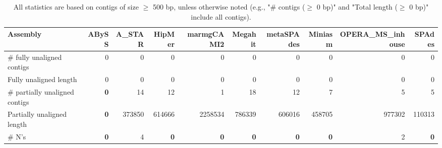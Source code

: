 \documentclass[12pt,a4paper]{article}
\begin{document}
\begin{table}[ht]
\begin{center}
\caption{All statistics are based on contigs of size $\geq$ 500 bp, unless otherwise noted (e.g., "\# contigs ($\geq$ 0 bp)" and "Total length ($\geq$ 0 bp)" include all contigs).}
\begin{tabular}{|l*{9}{|r}|}
\hline
Assembly & ABySS & A\_STAR & HipMer & marmgCAMI2 & Megahit & metaSPAdes & Miniasm & OPERA\_MS\_inhouse & SPAdes \\ \hline
\# fully unaligned contigs & 0 & 0 & 0 & 0 & 0 & 0 & 0 & 0 & 0 \\ \hline
Fully unaligned length & 0 & 0 & 0 & 0 & 0 & 0 & 0 & 0 & 0 \\ \hline
\# partially unaligned contigs & {\bf 0} & 14 & 12 & 1 & 18 & 12 & 7 & 5 & 5 \\ \hline
Partially unaligned length & {\bf 0} & 373850 & 614666 & 2258534 & 786339 & 606016 & 458705 & 977302 & 110313 \\ \hline
\# N's & {\bf 0} & 4 & {\bf 0} & {\bf 0} & {\bf 0} & {\bf 0} & {\bf 0} & 2 & {\bf 0} \\ \hline
\end{tabular}
\end{center}
\end{table}
\end{document}
